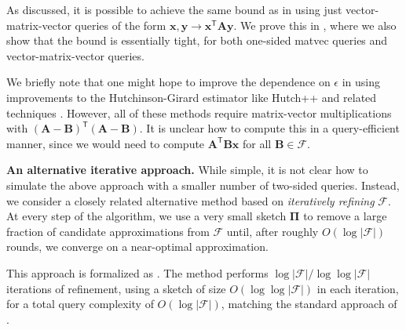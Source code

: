 \documentclass{article}[11pt]
\theoremstyle{definition}
\newcommand{\bv}[1]{\boldsymbol{\mathbf{#1}}}
\newcommand{\T}{\mathsf{T}}
\newcommand{\F}{\mathcal{F}}
\begin{document}
    As discussed, it is possible to achieve the same bound as in  using just vector-matrix-vector queries of the form $\bv x, \bv y \rightarrow \bv x^\T \bv{A} \bv y$. 
    We prove this in , where we also show that the bound is essentially tight, for both one-sided matvec queries and vector-matrix-vector queries.

    We briefly note that one might hope to improve the dependence on $\epsilon$ in  using improvements to the Hutchinson-Girard estimator like Hutch++ and related techniques \cite{MeyerMuscoMusco:2021,PerssonCortinovisKressner:2022,EpperlyTroppWebber:2024,JiangPhamWoodruff:2024}. However, all of these methods require matrix-vector multiplications with $(\bv{A} - \bv{B})^\T(\bv{A} - \bv{B})$. It is unclear how to compute this in a query-efficient manner, since we would need to compute $\bv{A}^\T\bv{B}\bv{x}$ for all $\bv{B} \in \F$.

    \smallskip \noindent\textbf{An alternative iterative approach.} While simple, it is not clear how to simulate the above approach with a smaller number of two-sided queries. Instead, we consider a closely related alternative method based on \emph{iteratively refining} $\F$. At every step of the algorithm, we use a very small sketch $\bv{\Pi}$ to remove a large fraction of candidate approximations from $\mathcal{F}$ until, after roughly $O(\log|\F|)$ rounds, we converge on a near-optimal approximation.

    This approach is formalized as . The method performs $\log |\F|/\log \log |\F|$ iterations of refinement, using a sketch of size $O(\log \log |\F|)$ in each iteration, for a total query complexity of $O(\log|\F|)$, matching the standard approach of .
\end{document}
